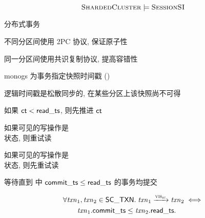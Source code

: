 
\begin{frame}{}

  \[
  	\textsc{ShardedCluster} \models \textsc{SessionSI}
  \]
\end{frame}

\begin{frame}{}
  \begin{center}
    分布式事务

    \vspace{0.60cm}
    不同分区间使用 2PC 协议, 保证原子性

    \vspace{0.30cm}
    同一分区间使用共识复制协议, 提高容错性
  \end{center}
\end{frame}

\begin{frame}{}
\end{frame}

\begin{frame}{}
  \begin{center}
    monogs 为事务指定快照时间戳 (\readts)

    \vspace{0.50cm}
    逻辑时间戳是松散同步的, 在某些分区上该快照尚不可得
  \end{center}

  \pause
  \vspace{0.50cm}
  \begin{description}
    \setlength{\itemsep}{10pt}
    \item[\caseclockskew:] 如果 $\sf ct < {\sf read\_ts}$, 则先推进 $\sf ct$
    \item[\casependingcommitread:] 如果可见的写操作是 \\[5pt] \wtprepareinprogress{} 状态, 则重试读
    \item[\casependingcommitupdate] 如果可见的写操作是 \\[5pt] \wtprepareinprogress{} 状态, 则先重试读
    \item[\caseholes:] 等待直到 \oplog{} 中 ${\sf commit\_ts} \le {\sf read\_ts}$ 的事务均提交
  \end{description}
\end{frame}

\begin{frame}{}
  \begin{definition}
    \vspace{-0.30cm}
    \begin{align*}
      &\forall \mathit{txn}_{1}, \mathit{txn}_{2} \in {\sf SC\_TXN}.\;
        \mathit{txn}_{1} \xrightarrow{\textsc{vis}_{\textsc{sc}}} \mathit{txn}_{2} \iff \\
        &\qquad \mathit{txn}_{1}.{\sf commit\_ts} \le \mathit{txn}_{2}.{\sf read\_ts}.
    \end{align*}
  \end{definition}
\end{frame}

